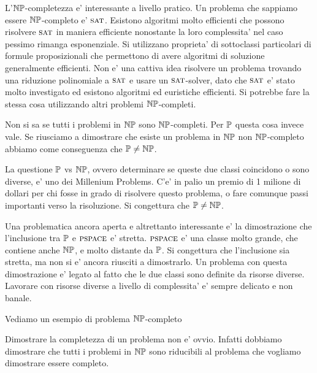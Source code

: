 L'$\mathbb{NP}$-completezza e' interessante a livello pratico. Un problema che sappiamo essere
$\mathbb{NP}$-completo e' $\textsc{sat}$. Esistono algoritmi molto efficienti che possono risolvere $\textsc{sat}$ in
maniera efficiente nonostante la loro complessita' nel caso pessimo rimanga esponenziale. Si
utilizzano proprieta' di sottoclassi particolari di formule proposizionali che permettono di avere
algoritmi di soluzione generalmente efficienti. Non e' una cattiva idea risolvere un problema
trovando una riduzione polinomiale a $\textsc{sat}$ e usare un $\textsc{sat}$-solver, dato che $\textsc{sat}$ e' stato molto
investigato ed esistono algoritmi ed euristiche efficienti. Si potrebbe fare la stessa cosa
utilizzando altri problemi $\mathbb{NP}$-completi.

Non si sa se tutti i problemi in $\mathbb{NP}$ sono $\mathbb{NP}$-completi. Per $\mathbb{P}$ questa cosa
invece vale.  Se riusciamo a dimostrare che esiste un problema in $\mathbb{NP}$ non $\mathbb{NP}$-completo
abbiamo come conseguenza che
$\mathbb{P} \not= \mathbb{NP}$.


La questione $\mathbb{P}$ vs $\mathbb{NP}$, ovvero determinare se queste due classi coincidono o sono
diverse, e' uno dei Millenium Problems. C'e' in palio un premio di 1 milione di dollari per chi
fosse in grado di risolvere questo problema, o fare comunque passi importanti verso la risoluzione.
Si congettura che $\mathbb{P} \not= \mathbb{NP}$.

Una problematica ancora aperta e altrettanto interessante e' la dimostrazione che l'inclusione tra
$\mathbb{P}$ e $\textsc{pspace}$ e' stretta. $\textsc{pspace}$ e' una classe molto grande, che contiene anche
$\mathbb{NP}$, e molto distante da $\mathbb{P}$. Si congettura che l'inclusione sia stretta, ma non si e'
ancora riusciti a dimostrarlo. Un problema con questa dimostrazione e' legato al fatto che le due
classi sono definite da risorse diverse. Lavorare con risorse diverse a livello di complessita' e'
sempre delicato e non banale.


Vediamo un esempio di problema $\mathbb{NP}$-completo

Dimostrare la completezza di un problema non e' ovvio. Infatti dobbiamo dimostrare che tutti i
problemi in $\mathbb{NP}$ sono riducibili al problema che vogliamo dimostrare essere completo.


